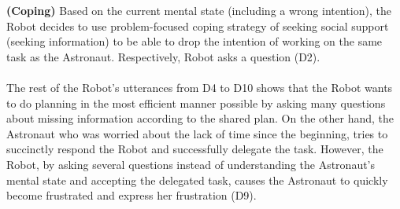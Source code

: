 \noindent\textbf{(Coping)} Based on the current mental state (including a
wrong intention), the Robot decides to use problem-focused coping strategy of
seeking social support (seeking information) to be able to drop the intention of
working on the same task as the Astronaut. Respectively, Robot asks a question
(D2).\\

\noindent{}\\

The rest of the Robot's utterances from D4 to D10 shows that the Robot wants to
do planning in the most efficient manner possible by asking many questions about
missing information according to the shared plan. On the other hand, the
Astronaut who was worried about the lack of time since the beginning, tries to
succinctly respond the Robot and successfully delegate the task. However, the
Robot, by asking several questions instead of understanding the Astronaut's
mental state and accepting the delegated task, causes the Astronaut to quickly
become frustrated and express her frustration (D9).\\

\noindent{}\\


